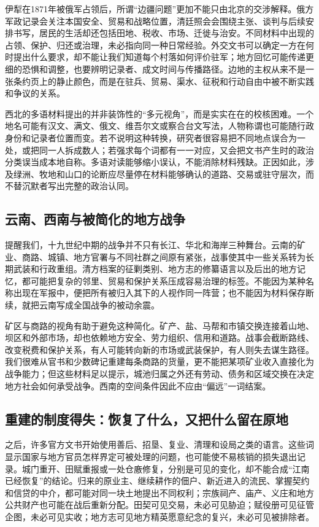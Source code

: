 伊犁在1871年被俄军占领后，所谓“边疆问题”更加不能只由北京的交涉解释。俄方军政记录会关注本国安全、贸易和战略位置，清廷照会会围绕主张、谈判与后续安排书写，居民的生活却还包括田地、税收、市场、迁徙与治安。不同材料中出现的占领、保护、归还或治理，未必指向同一种日常经验。外交文书可以确定一方在何时提出什么要求，却不能让我们知道每个村落如何评价驻军；地方回忆可能传递更细的恐惧和调整，也要辨明记录者、成文时间与传播路径。边地的主权从来不是一张条约页上的静止颜色，而是在驻兵、贸易、渠水、征税和行动自由中被不断实践和争议的关系。

西北的多语材料提出的并非装饰性的“多元视角”，而是实实在在的校核困难。一个地名可能有汉文、满文、俄文、维吾尔文或察合台文写法，人物称谓也可能随行政身份和记录者位置而变。若不说明这种转换，研究者很容易把不同地点误合为一处，或把同一人拆成数人；若强求每个词都有一一对应，又会把文书产生时的政治分类误当成本地自称。多语对读能够缩小误认，不能消除材料残缺。正因如此，涉及绿洲、牧地和山口的论断应尽量停在材料能够确认的道路、交易或驻守层次，而不替沉默者写出完整的政治认同。

\subsection{云南、西南与被简化的地方战争}

提醒我们，十九世纪中期的战争并不只有长江、华北和海岸三种舞台。云南的矿业、商路、城镇、地方官署与不同社群之间原有紧张，战事使其中一些关系转为长期武装和行政重组。清方档案的征剿类别、地方志的修纂语言以及后出的地方记忆，都可能把复杂的邻里、贸易和保护关系压成容易治理的标签。不能因为某种名称出现在军报中，便把所有被归入其下的人视作同一阵营；也不能因为材料保存断续，就把云南写成全国战争的被动余震。

矿区与商路的视角有助于避免这种简化。矿产、盐、马帮和市镇交换连接着山地、坝区和外部市场，却也依赖地方安全、劳力组织、信用和道路。战事会截断路线、改变税费和保护关系，有人可能转向新的市场或武装保护，有人则失去谋生路径。我们很难从官书和少数碑记重建每条商路的货量，更不能把某项矿业收入直接化为战争能力；但这些材料足以提示，城池归属之外还有劳动、债务和区域交换在决定地方社会如何承受战争。西南的空间条件因此不应由“偏远”一词结案。

\subsection{重建的制度得失：恢复了什么，又把什么留在原地}

之后，许多官方文书开始使用善后、招垦、复业、清理和设局之类的语言。这些词显示国家与地方官员怎样界定可被处理的问题，也可能使不易核销的损失退出记录。城门重开、田赋重报或一处仓廒修复，分别是可见的变化，却不能合成“江南已经恢复”的结论。归来的原业主、继续耕作的佃户、新近进入的流民、掌握契约和信贷的中介，都可能对同一块土地提出不同权利；宗族祠产、庙产、义庄和地方公共财产也可能在战后重新分配。田契可见交易，未必可见胁迫；赋役册可见征管企图，未必可见实收；地方志可见地方精英愿意纪念的复兴，未必可见被排除者。

